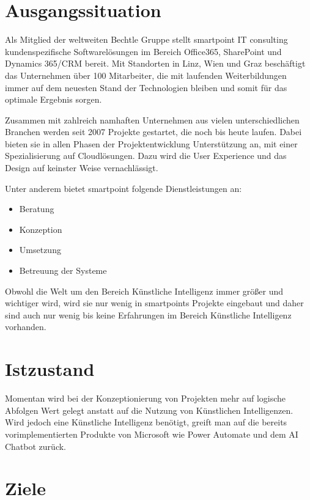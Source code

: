 \section{Ausgangssituation}

Als Mitglied der weltweiten Bechtle Gruppe stellt smartpoint IT consulting kundenspezifische Softwarelösungen im Bereich Office365, SharePoint und Dynamics 365/CRM bereit. Mit Standorten in Linz, Wien und Graz beschäftigt das Unternehmen über 100 Mitarbeiter, die mit laufenden Weiterbildungen immer auf dem neuesten Stand der Technologien bleiben und somit für das optimale Ergebnis sorgen.

Zusammen mit zahlreich namhaften Unternehmen aus vielen unterschiedlichen Branchen werden seit 2007 Projekte gestartet, die noch bis heute laufen. Dabei bieten sie in allen Phasen der Projektentwicklung Unterstützung an, mit einer Spezialisierung auf Cloudlösungen. Dazu wird die User Experience und das Design auf keinster Weise vernachlässigt.

Unter anderem bietet smartpoint folgende Dienstleistungen an:

\begin{itemize}
    \item Beratung
    \item Konzeption
    \item Umsetzung
    \item Betreuung der Systeme
\end{itemize}

Obwohl die Welt um den Bereich Künstliche Intelligenz immer größer und wichtiger wird, wird sie nur wenig in smartpoints Projekte eingebaut und daher sind auch nur wenig bis keine Erfahrungen im Bereich Künstliche Intelligenz vorhanden.

\section{Istzustand}

Momentan wird bei der Konzeptionierung von Projekten mehr auf logische Abfolgen Wert gelegt anstatt auf die Nutzung von Künstlichen Intelligenzen. Wird jedoch eine Künstliche Intelligenz benötigt, greift man auf die bereits vorimplementierten Produkte von Microsoft wie Power Automate und dem AI Chatbot zurück. 

\section{Ziele}

